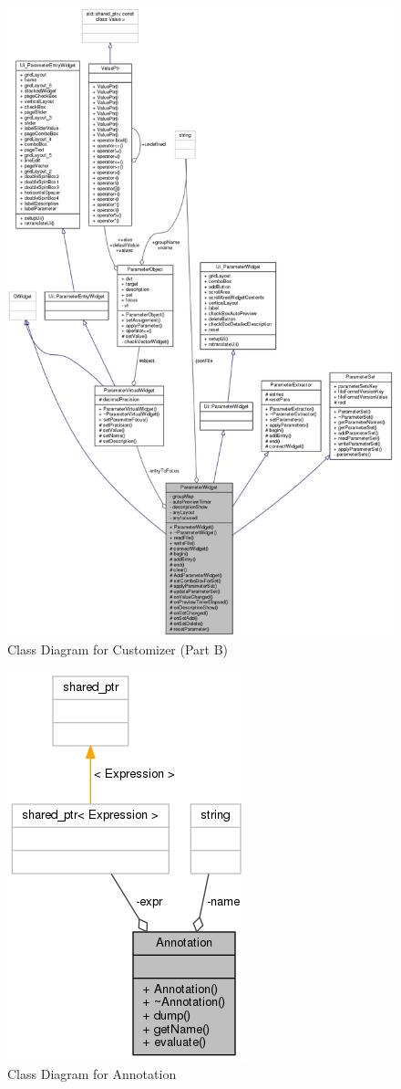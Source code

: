 \begin{figure}
    \centering
    \includegraphics[scale=0.40]{images/collaborative}
    \caption{Class Diagram for Customizer (Part B)}
    \label{fig:collaborative}
\end{figure}
\begin{figure}
\centering
\includegraphics[width=0.4\linewidth]{images/classAnnotation__coll__graph}
\caption{Class Diagram for Annotation}
\label{fig:classAnnotation__coll__graph}
\end{figure}
